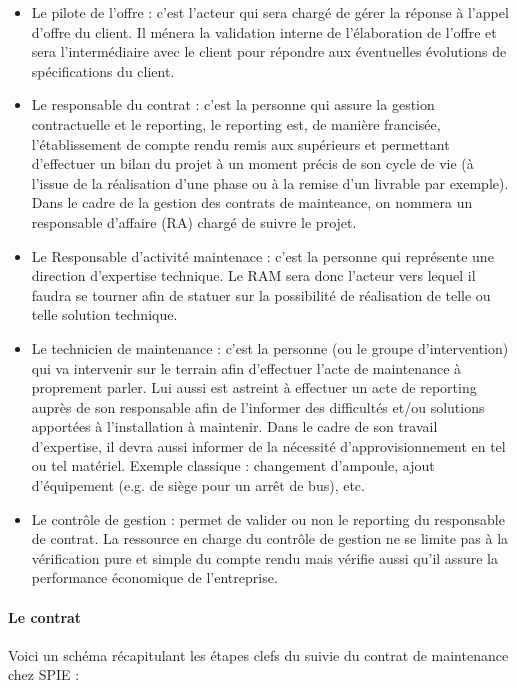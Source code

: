 \begin{itemize}
\item Le pilote de l'offre : c'est l'acteur qui sera chargé de gérer la réponse à l'appel d'offre du client. Il ménera la validation interne de l'élaboration de l'offre et sera l'intermédiaire avec le client pour répondre aux éventuelles évolutions de spécifications du client.
\item Le responsable du contrat : c’est la personne qui assure la gestion contractuelle et le reporting, le reporting est, de manière francisée, l’établissement de compte rendu remis aux supérieurs et permettant d’effectuer un bilan du projet à un moment précis de son cycle de vie (à l’issue de la réalisation d’une phase ou à la remise d’un livrable par exemple). Dans le cadre de la gestion des contrats de mainteance, on nommera un responsable d'affaire (RA) chargé de suivre le projet.
\item Le Responsable d'activité maintenace : c'est la personne qui représente une direction d'expertise technique. Le RAM sera donc l'acteur vers lequel il faudra se tourner afin de statuer sur la possibilité de réalisation de telle ou telle solution technique.
\item Le technicien de maintenance : c’est la personne (ou le groupe d’intervention) qui va intervenir sur le terrain afin d'effectuer l’acte de maintenance à proprement parler. Lui aussi est astreint à effectuer un acte de reporting auprès de son responsable afin de l'informer des difficultés et/ou solutions apportées à l’installation à maintenir. Dans le cadre de son travail d’expertise, il devra aussi informer de la nécessité d’approvisionnement en tel ou tel matériel. Exemple classique : changement d’ampoule, ajout d'équipement (e.g. de siège pour un arrêt de bus), etc.
\item Le contrôle de gestion : permet de valider ou non le reporting du responsable de contrat. La ressource en charge du contrôle de gestion ne se limite pas à la vérification pure et simple du compte rendu mais vérifie aussi qu'il assure la performance économique de l’entreprise.
\end{itemize}


\paragraph{Le contrat}
Voici un schéma récapitulant les étapes clefs du suivie du contrat de maintenance chez SPIE :

